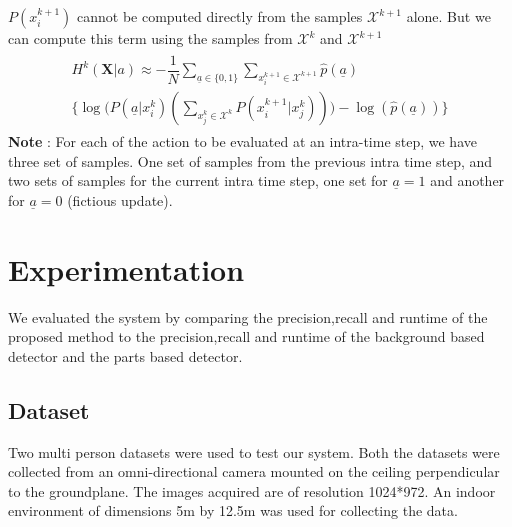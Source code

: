 \documentclass[10pt,twocolumn,letterpaper]{article}
\begin{document}
$P(x^{k+1}_{i})$ cannot be computed directly from the samples $\mathcal{X}^{k+1}$ alone. But we can compute this term using the samples from $\mathcal{X}^{k}$ and $\mathcal{X}^{k+1}$
\begin{align}
\begin{split}
H^{k}(\textbf{X}| a)\approx -\dfrac{1}{N}\sum_{\underline{a}\in\lbrace 0 ,1 \rbrace} \sum_{x_{i}^{k+1}\in\mathcal{X}^{k+1}} \widehat{p}( \underline{a}) \\ \Big\lbrace\log\Big(P( \underline{a}|x^{k}_{i})(\sum_{x_{j}^{k}\in\mathcal{X}^{k}}P(x^{k+1}_{i}|x^{k}_{j}))\Big) - \log(\widehat{p}( \underline{a}))\Big\rbrace
\end{split}
\end{align}
\textbf{Note} :
For each of the action to be evaluated at an intra-time step, we have three set of samples. One set of samples from the previous intra time step, and two sets of samples for the current intra time step, one set for $\underline{a}=1$ and another for $\underline{a}=0$ (fictious update).
  
\section{Experimentation}\label{sec:exp}
We evaluated the system by comparing the precision,recall and runtime of the proposed method to the precision,recall and runtime of the background based detector and the parts based detector.
\subsection{Dataset}
Two multi person datasets were used to test our system. Both the datasets were collected from an omni-directional camera mounted on the ceiling perpendicular to the groundplane. The images acquired are of resolution 1024*972. An indoor environment of dimensions 5m by 12.5m was used for collecting the data. 
\end{document}

